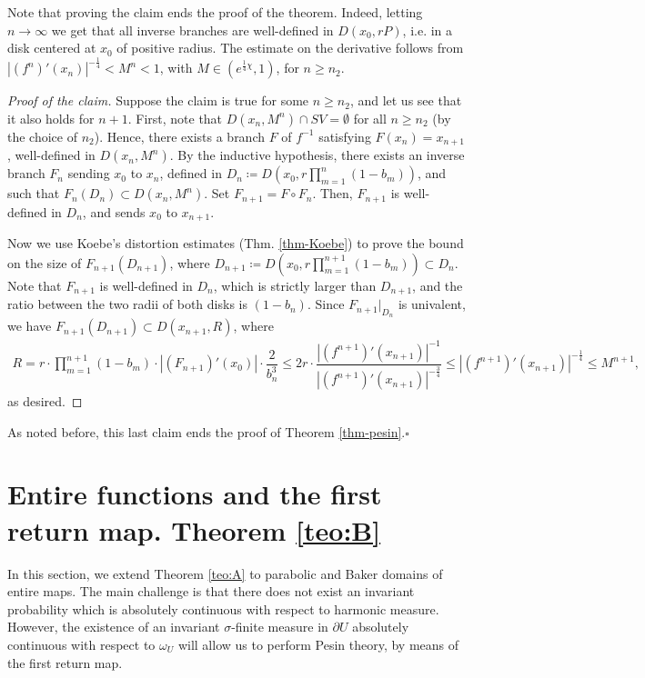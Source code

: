 \documentclass[11pt]{article}
\theoremstyle{definition}
\theoremstyle{remark}
\newcounter{main}
\theoremstyle{plain}
\begin{document}
Note that proving the claim ends the proof of the theorem. Indeed,  letting $ n\to \infty $ we get that all inverse branches are well-defined in $ D(x_0, rP) $, i.e. in a disk centered at $ x_0 $ of positive radius. The estimate on the derivative follows from  $\left| (f^n)'(x_n)\right| ^{-\frac{1}{4}}<M^n<1$, with $ M\in (e^{\frac{1}{4}\chi}, 1) $, for $ n\geq n_2 $. 
\begin{proof}[Proof of the claim]
	Suppose the claim is true for some $ n\geq n_2 $, and let us see that it also holds for $ n+1 $.
	First, note that $ D(x_n, M^n)\cap SV=\emptyset  $ for all $ n\geq n_2 $ (by the choice of $ n_2 $).
	  Hence, there exists a branch $ F $ of $ f^{-1} $ satisfying $ F(x_n)=x_{n+1} $, well-defined in $ D(x_n, M^n)$. By the inductive hypothesis, there exists an inverse branch $ F_n $ sending $ x_0 $ to $ x_n$, defined in $D_n\coloneqq  D(x_0, r\prod_{m=1}^n(1-b_m)) $, and such that $ F_n(D_n )\subset D(x_n, M^n) $.
	Set $ F_{n+1}=F\circ F_n $. Then, $ F_{n+1} $   is well-defined in $ D_n$, and sends $ x_0 $ to $ x_{n+1} $.  
	
		Now we use Koebe's distortion estimates (Thm. \ref{thm-Koebe}) to prove the bound on the size of $  F_{n+1}( D_{n+1})$, where $ D_{n+1}\coloneqq  D(x_0, r\prod_{m=1}^{n+1}(1-b_m))\subset D_n$.  Note that $ F_{n+1} $ is well-defined in $ D_n$, which is strictly larger than $ D_{n+1}$, and the ratio between the two radii of both disks is $ (1-b_{n}) $. Since $ F_{n+1}|_{D_{n}}$ is univalent, we have $ F_{n+1}(D_{n+1})\subset D(x_{n+1}, R) $, where \begin{align*}
		R=r\cdot \prod_{m= 1}^{n+1}(1-b_m)\cdot \left| (F_{n+1})'(x_{0})\right| \cdot \dfrac{2}{b^3_n}\leq 2r\cdot\dfrac{\left| (f^{n+1})'(x_{n+1})\right|^{-1} }{\left| (f^{n+1})'(x_{n+1})\right| ^{-\frac34}}\leq\left| (f^{n+1})'(x_{n+1})\right| ^{-\frac14} \leq M^{n+1},
	\end{align*} as desired.
\end{proof}
As noted before, this last claim ends the proof of Theorem \ref{thm-pesin}.\hfill $ \square $
\section{Entire functions and the first return map. Theorem \ref{teo:B}}\label{sect-pesin-entire}

In this section, we extend Theorem \ref{teo:A} to parabolic and Baker domains of entire maps. The main challenge is that there does not exist an invariant probability  which is absolutely continuous  with respect to harmonic measure. However, the existence of an invariant $ \sigma $-finite measure in $ \partial U $ absolutely continuous  with respect to $ \omega_U $ will allow us to perform Pesin theory, by means of the first return map.
\end{document}
